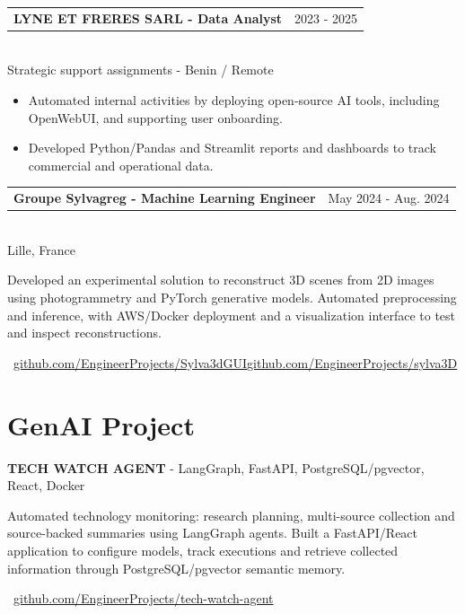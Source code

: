 \documentclass[10pt,a4paper]{article}
\makeatletter
\newcommand{\role}[3]{%
  \vspace{3pt}
  \begin{tabularx}{\linewidth}{@{}Xr@{}}
  \textbf{#1} & {\color{muted}#2}
  \end{tabularx}\vspace{0.8pt}\\
  {\color{muted}#3}\par
  \vspace{3pt}
}
\newcommand{\projectline}[2]{\textbf{#1} - #2\par}
\newcommand{\githublink}[2]{\par{\footnotesize\color{accent}\faIcon{github}\ \href{#1}{#2}}\par}
\newlength{\maincolumnheight}
\makeatother
\begin{document}
\begin{lrbox}{\maincolumnbox}
\begin{minipage}[t]{0.695\textwidth}
\vspace{8pt}
\role{LYNE ET FRERES SARL - Data Analyst}{2023 - 2025}{Strategic support assignments - Benin / Remote}
\begin{itemize}
  \item Automated internal activities by deploying open-source AI tools, including OpenWebUI, and supporting user onboarding.
  \item Developed Python/Pandas and Streamlit reports and dashboards to track commercial and operational data.
\end{itemize}

\vspace{6pt}
\role{Groupe Sylvagreg - Machine Learning Engineer}{May 2024 - Aug. 2024}{Lille, France}
Developed an experimental solution to reconstruct 3D scenes from 2D images using photogrammetry and PyTorch generative models. Automated preprocessing and inference, with AWS/Docker deployment and a visualization interface to test and inspect reconstructions.\par
{\fontsize{7.5pt}{9pt}\selectfont\color{accent}\ \href{https://github.com/EngineerProjects/Sylva3dGUI}{github.com/EngineerProjects/Sylva3dGUI}\enspace\textbullet\enspace\href{https://github.com/EngineerProjects/sylva3D}{github.com/EngineerProjects/sylva3D}}\par

\section{GenAI Project}
\projectline{TECH WATCH AGENT}{LangGraph, FastAPI, PostgreSQL/pgvector, React, Docker}
Automated technology monitoring: research planning, multi-source collection and source-backed summaries using LangGraph agents. Built a FastAPI/React application to configure models, track executions and retrieve collected information through PostgreSQL/pgvector semantic memory.
\githublink{https://github.com/EngineerProjects/tech-watch-agent}{github.com/EngineerProjects/tech-watch-agent}

\end{minipage}
\end{lrbox}
\setlength{\maincolumnheight}{\dimexpr\ht\maincolumnbox+\dp\maincolumnbox\relax}
\end{document}
